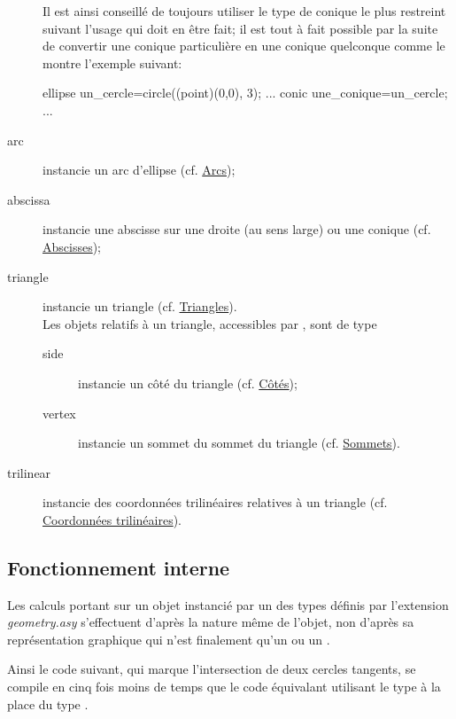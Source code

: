 \documentclass[pdftex]{article}
\newcommand{\geo}{l'extension \emph{geometry.asy}\xspace}
\begin{document}
\begin{description}
  Il est ainsi conseillé de toujours utiliser le type de conique le
  plus restreint suivant l'usage qui doit en être fait; il est tout à
  fait possible par la suite de convertir une conique particulière
  en une conique quelconque comme le montre l'exemple suivant:
  \begin{aVerbatim}
    ellipse un_cercle=circle((point)(0,0), 3);
    ...
    conic une_conique=un_cercle;
    ...
  \end{aVerbatim}
\item[\index{arc}arc] instancie un arc d'ellipse (cf. \href{#section.arc}{Arcs});
\item[\index{abscissa}abscissa] instancie une abscisse sur
  une droite (au sens large) ou une conique (cf. \href{#section.abscisse}{Abscisses});
\item[\index{triangle}triangle] instancie un triangle (cf. \href{#section.triangle}{Triangles}).\\
  Les objets relatifs à un triangle, accessibles par
  , sont de type
  \begin{description}
  \item[side] instancie un côté du triangle (cf. \href{#subsection.side}{Côtés});
  \item[vertex] instancie un sommet du sommet du
    triangle (cf. \href{#subsection.vertex}{Sommets}).
  \end{description}
\item[\index{trilinear}trilinear] instancie des coordonnées
  trilinéaires relatives à un triangle (cf. \href{#subsection.trilinear}{Coordonnées trilinéaires}).
\end{description}

\subsection{Fonctionnement interne}
Les calculs portant sur un objet instancié par un des types
définis par \geo  s'effectuent d'après la nature même de l'objet, non d'après sa
représentation graphique qui n'est finalement qu'un  ou un
.

Ainsi le code suivant, qui marque l'intersection de deux cercles
tangents, se compile en cinq fois moins de temps que le code
équivalant utilisant le type  à la place du type .
\end{document}
